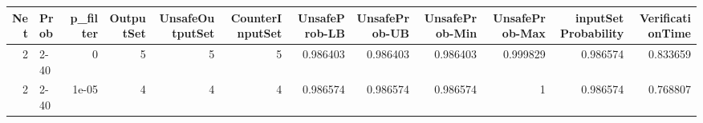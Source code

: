 \begin{tabular}{rlrrrrrrrrrr}
\hline
   Net & Prob   &   p\_filter &   OutputSet &   UnsafeOutputSet &   CounterInputSet &   UnsafeProb-LB &   UnsafeProb-UB &   UnsafeProb-Min &   UnsafeProb-Max &   inputSet Probability &   VerificationTime \\
\hline
     2 & 2-40   &      0     &           5 &                 5 &                 5 &        0.986403 &        0.986403 &         0.986403 &         0.999829 &               0.986574 &           0.833659 \\
     2 & 2-40   &      1e-05 &           4 &                 4 &                 4 &        0.986574 &        0.986574 &         0.986574 &         1        &               0.986574 &           0.768807 \\
\hline
\end{tabular}
